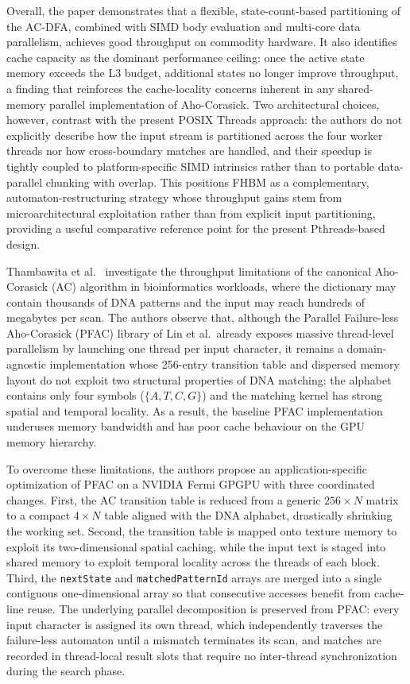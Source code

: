 Overall, the paper demonstrates that a flexible, state-count-based partitioning of the AC-DFA, combined with SIMD body evaluation and multi-core data parallelism, achieves good throughput on commodity hardware. It also identifies cache capacity as the dominant performance ceiling: once the active state memory exceeds the L3 budget, additional states no longer improve throughput, a finding that reinforces the cache-locality concerns inherent in any shared-memory parallel implementation of Aho-Corasick. Two architectural choices, however, contrast with the present POSIX Threads approach: the authors do not explicitly describe how the input stream is partitioned across the four worker threads nor how cross-boundary matches are handled, and their speedup is tightly coupled to platform-specific SIMD intrinsics rather than to portable data-parallel chunking with overlap. This positions FHBM as a complementary, automaton-restructuring strategy whose throughput gains stem from microarchitectural exploitation rather than from explicit input partitioning, providing a useful comparative reference point for the present Pthreads-based design.


Thambawita et al.\ \cite{Vajira2018} investigate the throughput limitations of the canonical Aho-Corasick (AC) algorithm in bioinformatics workloads, where the dictionary may contain thousands of DNA patterns and the input may reach hundreds of megabytes per scan. The authors observe that, although the Parallel Failure-less Aho-Corasick (PFAC) library of Lin et al.\ already exposes massive thread-level parallelism by launching one thread per input character, it remains a domain-agnostic implementation whose 256-entry transition table and dispersed memory layout do not exploit two structural properties of DNA matching: the alphabet contains only four symbols ($\{A,T,C,G\}$) and the matching kernel has strong spatial and temporal locality. As a result, the baseline PFAC implementation underuses memory bandwidth and has poor cache behaviour on the GPU memory hierarchy.

To overcome these limitations, the authors propose an application-specific optimization of PFAC on a NVIDIA Fermi GPGPU with three coordinated changes. First, the AC transition table is reduced from a generic $256 \times N$ matrix to a compact $4 \times N$ table aligned with the DNA alphabet, drastically shrinking the working set. Second, the transition table is mapped onto texture memory to exploit its two-dimensional spatial caching, while the input text is staged into shared memory to exploit temporal locality across the threads of each block. Third, the \texttt{nextState} and \texttt{matchedPatternId} arrays are merged into a single contiguous one-dimensional array so that consecutive accesses benefit from cache-line reuse. The underlying parallel decomposition is preserved from PFAC: every input character is assigned its own thread, which independently traverses the failure-less automaton until a mismatch terminates its scan, and matches are recorded in thread-local result slots that require no inter-thread synchronization during the search phase.

